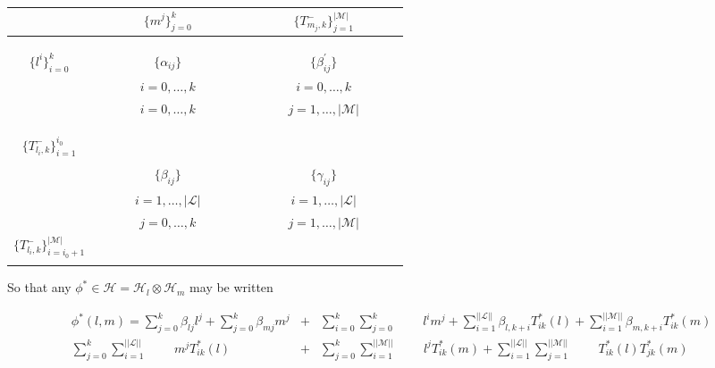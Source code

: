 \documentclass[12pt]{article}
\begin{document}
\begin{center}
\begin{tabular}{c|ccccccc:ccccccc} 
			                   &   & &  &$\big \lbrace  m^j  \big \rbrace_{j=0}^k$ & & & & & & &$\big \lbrace T_{m_j,k}^- \big \rbrace_{j=1}^{\vert \mathcal{M}\vert}$ & &  & \\ \hline
&&&&&&&&&&&&&& \\
&&&&&&&&&&&&&& \\
&&&&&&&&&&&&&& \\
$\big \lbrace  l^i  \big \rbrace_{i=0}^k$ &&&&$\big \lbrace \alpha_{ij} \big \rbrace$&&&&&&&$\big \lbrace \beta^\prime_{ij} \big \rbrace$&&&\\
&&&&$i=0,\dots,k$&&&&&&& $i=0,\dots,k$&&& \\
&&&&$i=0,\dots,k$&&&&&&&$j=1,\dots,\vert \mathcal{M}\vert$&&& \\
&&&&&&&&&&&&&&\\
&&&&&&&&&&&&&&\\ 
&&&&&&&&&&&&&& \\
$\big \lbrace T_{l_i,k}^- \big \rbrace_{i=1}^{i_0}$ &&&&&&&&&&&&&&\\
&&&&&&&&&&&&&& \\ 
&&&& $\big \lbrace \beta_{ij} \big \rbrace$ &&&&&&&$\big \lbrace \gamma_{ij} \big \rbrace$&&& \\
\hdashline
&&&&$i=1,\dots,\vert \mathcal{L} \vert$&&&&&&&$i=1,\dots,\vert \mathcal{L} \vert$&&& \\ 
&&&&$j=0,\dots,k$&&&&&&&$j=1,\dots,\vert \mathcal{M} \vert$&&& \\ 
$\big \lbrace T_{l_i,k}^- \big \rbrace_{i=i_0+1}^{\vert \mathcal{M}\vert}$ &&&&&&&&&&&&&&\\
&&&&&&&&&&&&&& \\ 
\end{tabular}
\end{center}

So that any $\phi^* \in \mathcal{H} = \mathcal{H}_l \otimes \mathcal{H}_m$ may be written

\begin{eqnarray*}
\phi^*\left( l,m \right) = \sum_{j=0}^k \beta_{lj}l^j + \sum_{j=0}^k \beta_{mj} m^{j} &+& \sum_{i=0}^k\sum_{j=0}^k\;\;\;\;\;\;\;\; l^i m^j  + \sum_{i=1}^{\vert \vert \mathcal{L}\vert \vert}\beta_{l,k+i} T_{ik}^*\left(l\right) + \sum_{i=1}^{\vert \vert \mathcal{M}\vert \vert}\beta_{m,k+i}T_{ik}^*\left(m\right) \\ 
 \sum_{j=0}^k\sum_{i=1}^{\vert \vert \mathcal{L}\vert \vert}\;\;\;\; \;\;\;\; m^j T_{ik}^*\left(l\right) &+& \sum_{j=0}^k\sum_{i=1}^{\vert \vert \mathcal{M}\vert \vert}\;\;\;\; \;\;\;\;   l^j T_{ik}^*\left(m\right) + \sum_{i=1}^{\vert \vert \mathcal{L}\vert \vert}\sum_{j=1}^{\vert \vert \mathcal{M}\vert \vert}\;\;\;\;\;\;\;\; T_{ik}^*\left(l\right)T_{jk}^*\left(m\right) \\
\end{eqnarray*}
\end{document}
